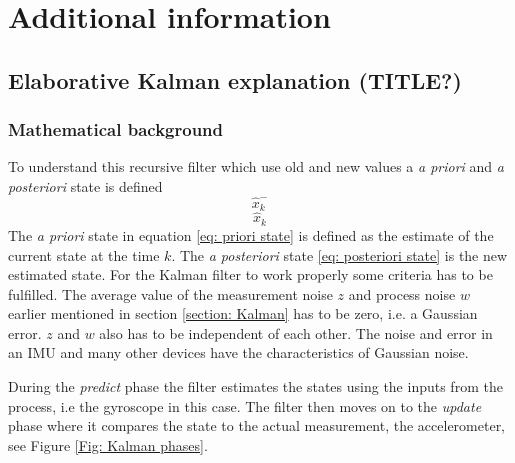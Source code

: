 \documentclass[a4paper,11pt]{kth-mag}
\begin{document}
%
\cleardoublepage


\cleardoublepage
\appendix
{}


\chapter{Additional information} \label{appA}
\section{Elaborative Kalman explanation (TITLE?)} \label{app: Kalman}
\subsection{Mathematical background}
To understand this recursive filter which use old and new values a \textit{a priori} and \textit{a posteriori} state is defined
\begin{equation} \label{eq: priori state}
\hat{x}^-_k
\end{equation}
\begin{equation} \label{eq: posteriori state}
\hat{x}_k
\end{equation}
The \textit{a priori}  state in equation \eqref{eq: priori state} is defined as the estimate of the current state at the time $k$. The \textit{a posteriori} state \eqref{eq: posteriori state} is the new estimated state.
For the Kalman filter to work properly some criteria has to be fulfilled. The average value of the measurement noise $z$ and process noise $w$ earlier mentioned in section \ref{section: Kalman} has to be zero, i.e. a Gaussian error. $z$ and $w$ also has to be independent of  each other. The noise and error in an IMU and many other devices have the characteristics of Gaussian noise.




During the \textit{predict} phase the filter estimates the states using the inputs from the process, i.e the gyroscope in this case. The filter then moves on to the \textit{update} phase where it compares the state to the actual measurement, the accelerometer, see Figure \ref{Fig: Kalman phases}.
\end{document}
